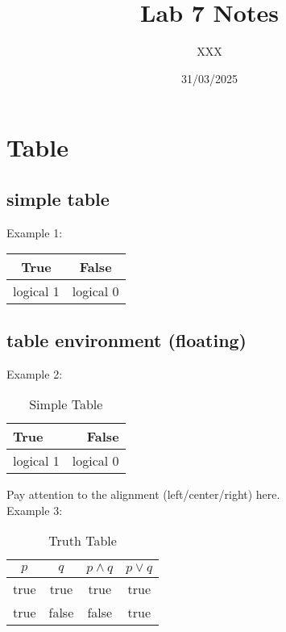 \documentclass[12pt,a4paper]{article} %
\title{Lab 7 Notes}
\author{XXX}
\date{31/03/2025}
\begin{document}
\maketitle
\tableofcontents

\newpage

\section{Table}
\subsection{simple table}
Example 1:\\

\begin{tabular}{|c|c|}
\hline
 True&False\\
\hline
logical 1 & logical 0\\
\hline
\end{tabular}

\subsection{table environment (floating)}

Example 2:\\
\begin{table}[!htb] %
\centering
\begin{tabular}{|l|r|} %
\hline
 True&False\\
\hline
logical 1 & logical 0\\
\hline
\end{tabular}
\caption{Simple Table}
\end{table}

\noindent Pay attention to the alignment (left/center/right) here.\\ %

\noindent Example 3:\\
\begin{table}[!htbp]
\centering
\begin{tabular}{c|c|c|c}
$p$ & $q$ & $p \land q$ &  $p \lor q$\\ %
\hline
true & true & true & true\\
\hline
true & false & false & true\\
\end{tabular}
\caption{Truth Table}
\end{table}
\end{document}

